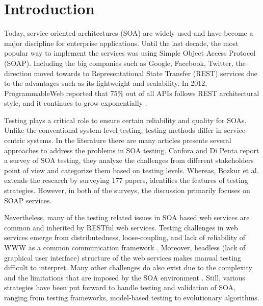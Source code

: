 \documentclass[english]{tktltiki}
\begin{document}
\section{Introduction}
Today, service-oriented architectures (SOA) are widely used and have become a major discipline for enterprise applications. Until the last decade, the most popular way to implement the services was using Simple Object Access Protocol (SOAP). Including the big companies such as Google, Facebook, Twitter, the direction moved towards to Representational State Transfer (REST) services due to the advantages such as its lightweight and scalability. In 2012, ProgrammableWeb reported that 75\% out of all APIs follows REST architectural style, and it continues to grow exponentially \cite{programmableweb}.

Testing plays a critical role to ensure certain reliability and quality for SOAs. Unlike the conventional system-level testing, testing methods differ in service-centric systems. In the literature there are many articles presents several approaches to address the problems in SOA testing. Canfora and Di Penta \cite{canfora2009service} report a survey of SOA testing, they analyze the challenges from different stakeholders point of view and categorize them based on testing levels. Whereas, Bozkur et al. \cite{bozkurt2013testing} extends the research by surveying 177 papers, identifies the features of testing strategies. However, in both of the surveys, the discussion primarily focuses on SOAP services.

Nevertheless, many of the testing related issues in SOA based web services are common and inherited by RESTful web services. Testing challenges in web services emerge from distributedness, loose-coupling, and lack of reliability of WWW as a common communication framework \cite{chakrabarti2009test}. Moreover, headless (lack of graphical user interface) structure of the web services makes manual testing difficult to interpret. Many other challenges do also exist due to the complexity and the limitations that are imposed by the SOA environment \cite{canfora2006testing, canfora2009service, bozkurt2013testing}. Still, various strategies have been put forward to handle testing and validation of SOA, ranging from testing frameworks, model-based testing to evolutionary algorithms.
\end{document}
